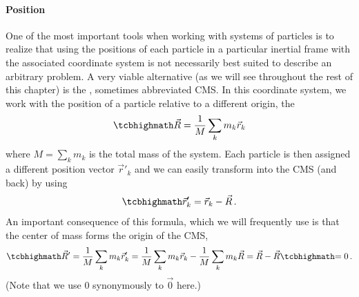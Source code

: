 \documentclass[../class_mech_main.tex]{subfiles}
\begin{document}


			\paragraph{Position}
One of the most important tools when working with systems of particles is to realize that using the positions of each particle in a particular inertial frame with the associated coordinate system is not necessarily best suited to describe an arbitrary problem. A very viable alternative (as we will see throughout the rest of this chapter) is the , sometimes abbreviated CMS. In this coordinate system, we work with the position of a particle relative to a different origin, the 
\begin{equation}\label{eq:center_of_mass_definition}
	\eqbox{
		\vec{R} = \frac{1}{M} \sum_k m_k \vec{r}_k
	}
\end{equation}
where $M = \sum_k m_k$ is the total mass of the system. Each particle is then assigned a different position vector $\vec{r}'_k$ and we can easily transform into the CMS (and back) by using
\begin{equation}
	\eqbox{
		\vec{r}'_k = \vec{r}_k - \vec{R}
	} \, .
\end{equation}
An important consequence of this formula, which we will frequently use is that the center of mass forms the origin of the CMS,
\begin{equation}
	\eqbox{
		\vec{R}'
	}= \frac{1}{M} \sum_k m_k \vec{r}'_k = \frac{1}{M} \sum_k m_k \vec{r}_k - \frac{1}{M} \sum_k m_k \vec{R} = \vec{R} - \vec{R}
	\eqbox{
		= 0
	} \, .
\end{equation}
(Note that we use $0$ synonymously to $\vec{0}$ here.)
\end{document}
